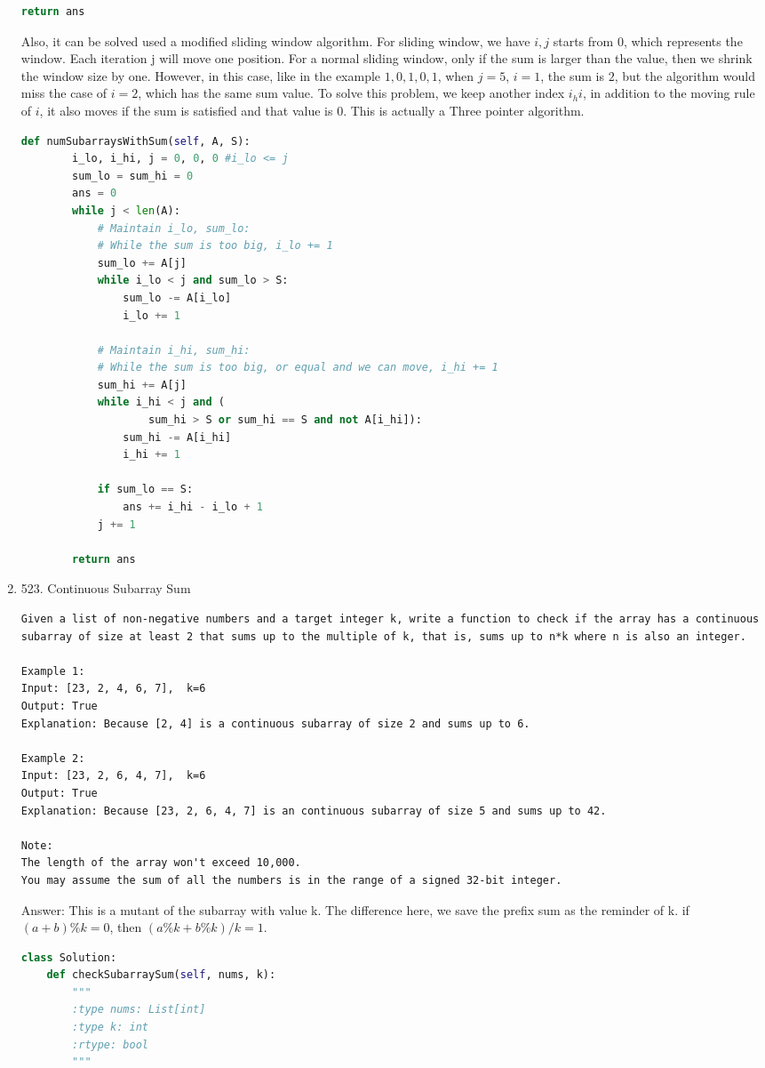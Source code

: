 \documentclass[../specific-algorithms.tex]{subfiles}
\begin{document}
\begin{enumerate}
\begin{lstlisting}[language=Python]
        return ans
\end{lstlisting}
Also, it can be solved used a modified sliding window algorithm. For sliding window, we have $i,j$ starts from 0, which represents the window. Each iteration j will move one position. For a normal sliding window, only if the sum is larger than the value, then we shrink the window size by one. However, in this case, like in the example $1, 0, 1, 0, 1$, when $j = 5$, $i = 1$, the sum is $2$, but the algorithm would miss the case of $i = 2$, which has the same sum value. To solve this problem, we keep another index $i_hi$, in addition to the moving rule of $i$, it also moves if the sum is satisfied and that value is $0$. This is actually a Three pointer algorithm. 
\begin{lstlisting}[language=Python]
    def numSubarraysWithSum(self, A, S):
        i_lo, i_hi, j = 0, 0, 0 #i_lo <= j
        sum_lo = sum_hi = 0
        ans = 0
        while j < len(A):
            # Maintain i_lo, sum_lo:
            # While the sum is too big, i_lo += 1
            sum_lo += A[j]
            while i_lo < j and sum_lo > S:
                sum_lo -= A[i_lo]
                i_lo += 1

            # Maintain i_hi, sum_hi:
            # While the sum is too big, or equal and we can move, i_hi += 1
            sum_hi += A[j]
            while i_hi < j and (
                    sum_hi > S or sum_hi == S and not A[i_hi]):
                sum_hi -= A[i_hi]
                i_hi += 1

            if sum_lo == S:
                ans += i_hi - i_lo + 1
            j += 1

        return ans
\end{lstlisting}
\item 523. Continuous Subarray Sum
\begin{lstlisting}
Given a list of non-negative numbers and a target integer k, write a function to check if the array has a continuous subarray of size at least 2 that sums up to the multiple of k, that is, sums up to n*k where n is also an integer.

Example 1:
Input: [23, 2, 4, 6, 7],  k=6
Output: True
Explanation: Because [2, 4] is a continuous subarray of size 2 and sums up to 6.

Example 2:
Input: [23, 2, 6, 4, 7],  k=6
Output: True
Explanation: Because [23, 2, 6, 4, 7] is an continuous subarray of size 5 and sums up to 42.

Note:
The length of the array won't exceed 10,000.
You may assume the sum of all the numbers is in the range of a signed 32-bit integer.
\end{lstlisting}
Answer: This is a mutant of the subarray with value k. The difference here, we save the prefix sum as the reminder of k. if $(a+b)\%k=0$, then $(a\%k+b\%k)/k=1$.
\begin{lstlisting}[language=Python]
class Solution:
    def checkSubarraySum(self, nums, k):
        """
        :type nums: List[int]
        :type k: int
        :rtype: bool
        """
        

\end{lstlisting}
\end{enumerate}
\end{document}

